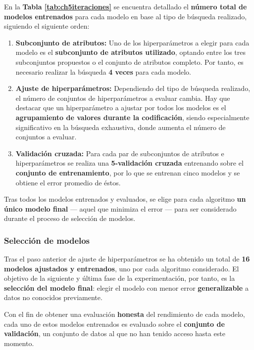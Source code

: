 En la \textbf{Tabla \ref{tab:ch5iteraciones}} se encuentra detallado el \textbf{número total de modelos entrenados} para cada modelo en base al tipo de búsqueda realizado, siguiendo el siguiente orden:
\begin{enumerate}[parsep=2pt, itemsep=2pt, topsep=4pt]
	\item \textbf{Subconjunto de atributos:} Uno de los hiperparámetros a elegir para cada modelo es el \textbf{subconjunto de atributos utilizado}, optando entre los tres subconjuntos propuestos o el conjunto de atributos completo. Por tanto, es necesario realizar la búsqueda \textbf{4 veces} para cada modelo.
	\item \textbf{Ajuste de hiperparámetros:} Dependiendo del tipo de búsqueda realizado, el número de conjuntos de hiperparámetros a evaluar cambia. Hay que destacar que un hiperparámetro a ajustar por todos los modelos es el \textbf{agrupamiento de valores durante la codificación}, siendo especialmente significativo en la búsqueda exhaustiva, donde aumenta el número de conjuntos a evaluar.
	\item \textbf{Validación cruzada:} Para cada par de subconjuntos de atributos e hiperparámetros se realiza una \textbf{5-validación cruzada} entrenando sobre el \textbf{conjunto de entrenamiento}, por lo que se entrenan cinco modelos y se obtiene el error promedio de éstos.
\end{enumerate}

Tras todos los modelos entrenados y evaluados, se elige para cada algoritmo \textbf{un único modelo final} --- aquel que minimiza el error --- para ser considerado durante el proceso de selección de modelos.

\subsubsection{Selección de modelos}

Tras el paso anterior de ajuste de hiperparámetros se ha obtenido un total de \textbf{16 modelos ajustados y entrenados}, uno por cada algoritmo considerado. El objetivo de la siguiente y última fase de la experimentación, por tanto, es la \textbf{selección del modelo final}: elegir el modelo con menor error \textbf{generalizable} a datos no conocidos previamente.

Con el fin de obtener una evaluación \textbf{honesta} del rendimiento de cada modelo, cada uno de estos modelos entrenados es evaluado sobre el \textbf{conjunto de validación}, un conjunto de datos al que no han tenido acceso hasta este momento.

